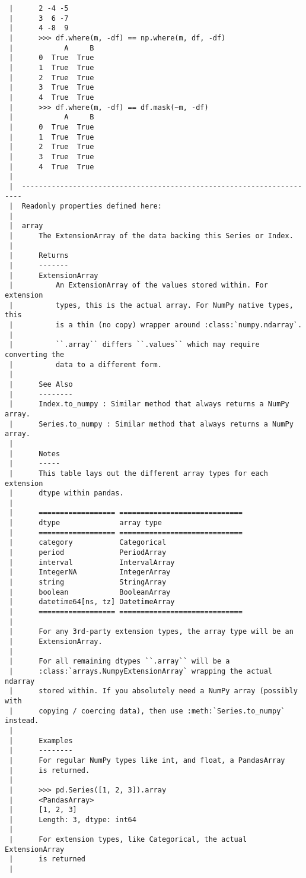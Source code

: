 \documentclass[
  letterpaper,
  DIV=11,
  numbers=noendperiod]{scrreprt}
\begin{document}
\begin{verbatim}
 |      2 -4 -5
 |      3  6 -7
 |      4 -8  9
 |      >>> df.where(m, -df) == np.where(m, df, -df)
 |            A     B
 |      0  True  True
 |      1  True  True
 |      2  True  True
 |      3  True  True
 |      4  True  True
 |      >>> df.where(m, -df) == df.mask(~m, -df)
 |            A     B
 |      0  True  True
 |      1  True  True
 |      2  True  True
 |      3  True  True
 |      4  True  True
 |  
 |  ----------------------------------------------------------------------
 |  Readonly properties defined here:
 |  
 |  array
 |      The ExtensionArray of the data backing this Series or Index.
 |      
 |      Returns
 |      -------
 |      ExtensionArray
 |          An ExtensionArray of the values stored within. For extension
 |          types, this is the actual array. For NumPy native types, this
 |          is a thin (no copy) wrapper around :class:`numpy.ndarray`.
 |      
 |          ``.array`` differs ``.values`` which may require converting the
 |          data to a different form.
 |      
 |      See Also
 |      --------
 |      Index.to_numpy : Similar method that always returns a NumPy array.
 |      Series.to_numpy : Similar method that always returns a NumPy array.
 |      
 |      Notes
 |      -----
 |      This table lays out the different array types for each extension
 |      dtype within pandas.
 |      
 |      ================== =============================
 |      dtype              array type
 |      ================== =============================
 |      category           Categorical
 |      period             PeriodArray
 |      interval           IntervalArray
 |      IntegerNA          IntegerArray
 |      string             StringArray
 |      boolean            BooleanArray
 |      datetime64[ns, tz] DatetimeArray
 |      ================== =============================
 |      
 |      For any 3rd-party extension types, the array type will be an
 |      ExtensionArray.
 |      
 |      For all remaining dtypes ``.array`` will be a
 |      :class:`arrays.NumpyExtensionArray` wrapping the actual ndarray
 |      stored within. If you absolutely need a NumPy array (possibly with
 |      copying / coercing data), then use :meth:`Series.to_numpy` instead.
 |      
 |      Examples
 |      --------
 |      For regular NumPy types like int, and float, a PandasArray
 |      is returned.
 |      
 |      >>> pd.Series([1, 2, 3]).array
 |      <PandasArray>
 |      [1, 2, 3]
 |      Length: 3, dtype: int64
 |      
 |      For extension types, like Categorical, the actual ExtensionArray
 |      is returned
 |      

\end{verbatim}
\end{document}
